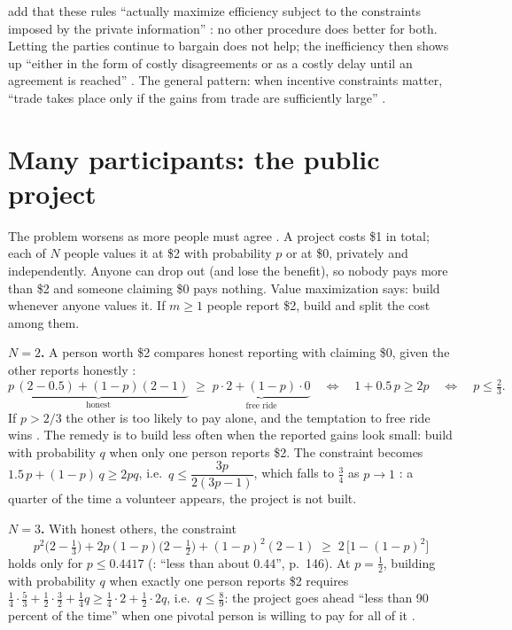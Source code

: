 \MR{} add that these rules ``actually maximize efficiency subject to the constraints imposed by
the private information'' : no other procedure does better for both. Letting the
parties continue to bargain does not help; the inefficiency then shows up ``either in the form
of costly disagreements or as a costly delay until an agreement is reached'' .
The general pattern: when incentive constraints matter, ``trade takes place only if the gains
from trade are sufficiently large'' .

\section{Many participants: the public project}\label{sec:b-many}

The problem worsens as more people must agree . A project costs \$1 in total; each of $N$
people values it at \$2 with probability $p$ or at \$0, privately and independently. Anyone can
drop out (and lose the benefit), so nobody pays more than \$2 and someone claiming \$0 pays
nothing. Value maximization says: build whenever anyone values it. If $m \ge 1$ people report
\$2, build and split the cost among them.

\textbf{$N = 2$.} A person worth \$2 compares honest reporting with claiming \$0, given the other
reports honestly :
\[
  \underbrace{p\,(2 - 0.5) + (1 - p)(2 - 1)}_{\text{honest}} \;\ge\; \underbrace{p \cdot 2 + (1-p)\cdot 0}_{\text{free ride}}
  \quad\Longleftrightarrow\quad 1 + 0.5\,p \ge 2p \quad\Longleftrightarrow\quad p \le \tfrac23 .
\]
If $p > 2/3$ the other is too likely to pay alone, and the temptation to free ride wins
. The remedy is to build less often when the reported gains look small: build with
probability $q$ when only one person reports \$2. The constraint becomes
$1.5\,p + (1-p)\,q \ge 2pq$, i.e.\ $q \le \dfrac{3p}{2(3p - 1)}$, which falls to $\tfrac34$ as
$p \to 1$ : a quarter of the time a volunteer appears, the project is not built.

\textbf{$N = 3$.} With honest others, the constraint
\[
  p^2\big(2 - \tfrac13\big) + 2p(1-p)\big(2 - \tfrac12\big) + (1-p)^2(2 - 1) \;\ge\; 2\,\big[1 - (1-p)^2\big]
\]
holds only for $p \le 0.4417$ (\MR: ``less than about 0.44'', p.~146). At $p = \tfrac12$, building
with probability $q$ when exactly one person reports \$2 requires
$\tfrac14 \cdot \tfrac53 + \tfrac12 \cdot \tfrac32 + \tfrac14 q \ge \tfrac14 \cdot 2 + \tfrac12 \cdot 2q$,
i.e.\ $q \le \tfrac89$: the project goes ahead ``less than 90 percent of the time'' when one
pivotal person is willing to pay for all of it .

